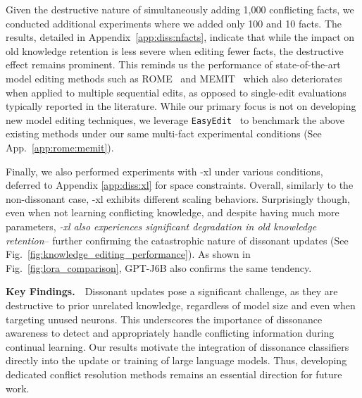 Given the destructive nature of simultaneously adding 1,000 conflicting facts, we conducted additional experiments where we added only 100 and 10 facts. The results, detailed in Appendix~\ref{app:diss:nfacts}, indicate that while the impact on old knowledge retention is less severe when editing fewer facts, the destructive effect remains prominent. This reminds us the performance of state-of-the-art model editing methods such as ROME~\citep{Meng2022} and MEMIT~\citep{Meng2022a} which also deteriorates when applied to multiple sequential edits, as opposed to single-edit evaluations typically reported in the literature. While our primary focus is not on developing new model editing techniques, we leverage \texttt{EasyEdit}~\citep{wang2023easyedit} to benchmark the above existing methods under our same multi-fact experimental conditions (See App.~\ref{app:rome:memit}). 


Finally, we also performed experiments with \gpttwo-xl under various conditions, deferred to  Appendix \ref{app:diss:xl} for space constraints. Overall, similarly to the non-dissonant case, \gpttwo-xl exhibits different scaling behaviors. Surprisingly though, even when not learning conflicting knowledge, and despite having much more parameters, \textit{\gpttwo-xl also experiences significant degradation in old knowledge retention}-- further confirming the catastrophic nature of dissonant updates (See Fig.~\ref{fig:knowledge_editing_performance}).
As shown in Fig.~\ref{fig:lora_comparison}, GPT-J6B also confirms the same tendency.

\textbf{Key Findings.}\ \ Dissonant updates pose a significant challenge, as they are destructive to prior unrelated knowledge, regardless of model size and even when targeting unused neurons. This underscores the importance of dissonance awareness to detect and appropriately handle conflicting information during continual learning. Our results motivate the integration of dissonance classifiers directly into the update or training of large language models. Thus, developing dedicated conflict resolution methods remains an essential direction for future work.

